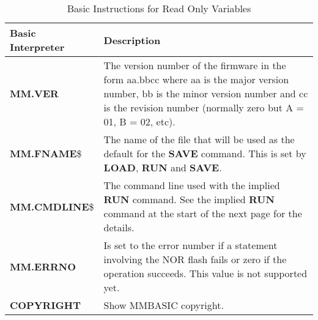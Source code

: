 \begin{table}[]
\centering
\caption{Basic Instructions for Read Only Variables}
\label{Basic_Instructions_for_Read_Only_Variables}
\begin{tabular}{|p{4cm}|p{10cm}|}
\hline
\textbf{Basic Interpreter} & \textbf{Description}                                                   
\\ \hline
\textbf{MM.VER} & The version number of the firmware in the form aa.bbcc where aa is the major version number, bb is the minor version number and cc is the revision number (normally zero but A = 01, B = 02, etc).
\\ \hline
\textbf{MM.FNAME}\$ & The name of the file that will be used as the default for the \textbf{SAVE} command. This is set by \textbf{LOAD}, \textbf{RUN} and \textbf{SAVE}.
\\ \hline
\textbf{MM.CMDLINE}\$ & The command line used with the implied \textbf{RUN} command. See the implied \textbf{RUN} command at the start of the next page for the details.
\\ \hline
\textbf{MM.ERRNO} & Is set to the error number if a statement involving the NOR flash fails or
zero if the operation succeeds. This value is not supported yet.
\\ \hline
\textbf{COPYRIGHT}
& Show MMBASIC copyright.
\\ \hline
\end{tabular}
\end{table}

